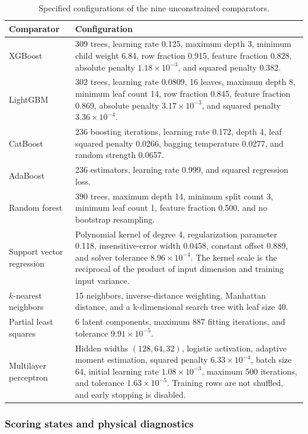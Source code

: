 \begin{table}[htbp]
\centering\small
\caption{Specified configurations of the nine unconstrained comparators.}\label{tab:icsor_comparator_settings}
\begin{tabular}{p{}p{}}
\toprule
Comparator & Configuration\\
\midrule
XGBoost & 309 trees, learning rate 0.125, maximum depth 3, minimum child weight 6.84, row fraction 0.915, feature fraction 0.828, absolute penalty \(1.18\times10^{-3}\), and squared penalty 0.382.\\
LightGBM & 302 trees, learning rate 0.0809, 16 leaves, maximum depth 8, minimum leaf count 14, row fraction 0.845, feature fraction 0.869, absolute penalty \(3.17\times10^{-3}\), and squared penalty \(3.36\times10^{-4}\).\\
CatBoost & 236 boosting iterations, learning rate 0.172, depth 4, leaf squared penalty 0.0266, bagging temperature 0.0277, and random strength 0.0657.\\
AdaBoost & 236 estimators, learning rate 0.999, and squared regression loss.\\
Random forest & 390 trees, maximum depth 14, minimum split count 3, minimum leaf count 1, feature fraction 0.500, and no bootstrap resampling.\\
Support vector regression & Polynomial kernel of degree 4, regularization parameter 0.118, insensitive-error width 0.0458, constant offset 0.889, and solver tolerance \(8.96\times10^{-4}\). The kernel scale is the reciprocal of the product of input dimension and training input variance.\\
\(k\)-nearest neighbors & 15 neighbors, inverse-distance weighting, Manhattan distance, and a k-dimensional search tree with leaf size 40.\\
Partial least squares & 6 latent components, maximum 887 fitting iterations, and tolerance \(9.91\times10^{-5}\).\\
Multilayer perceptron & Hidden widths \((128,64,32)\), logistic activation, adaptive moment estimation, squared penalty \(6.33\times10^{-4}\), batch size 64, initial learning rate \(1.08\times10^{-3}\), maximum 500 iterations, and tolerance \(1.63\times10^{-5}\). Training rows are not shuffled, and early stopping is disabled.\\
\bottomrule
\end{tabular}
\end{table}

\subsubsection{Scoring states and physical diagnostics}

